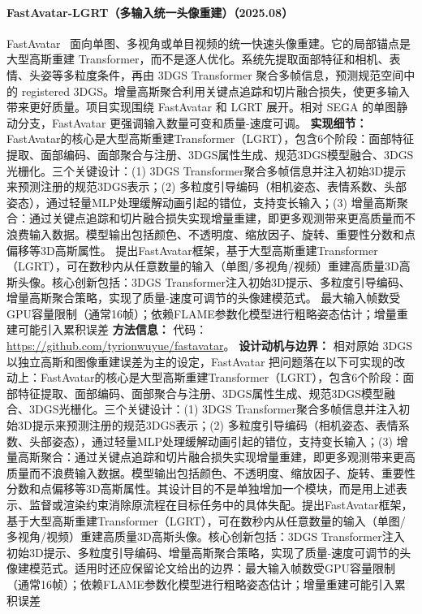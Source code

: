 \paragraph{FastAvatar-LGRT（多输入统一头像重建）（2025.08）}
FastAvatar~\cite{2508_19754} 面向单图、多视角或单目视频的统一快速头像重建。它的局部锚点是大型高斯重建 Transformer，而不是逐人优化。系统先提取面部特征和相机、表情、头姿等多粒度条件，再由 3DGS Transformer 聚合多帧信息，预测规范空间中的 registered 3DGS。增量高斯聚合利用关键点追踪和切片融合损失，使更多输入带来更好质量。项目实现围绕 FastAvatar 和 LGRT 展开。相对 SEGA 的单图静动分支，FastAvatar 更强调输入数量可变和质量-速度可调。
\textbf{实现细节：} FastAvatar的核心是大型高斯重建Transformer（LGRT），包含6个阶段：面部特征提取、面部编码、面部聚合与注册、3DGS属性生成、规范3DGS模型融合、3DGS光栅化。三个关键设计：(1) 3DGS Transformer聚合多帧信息并注入初始3D提示来预测注册的规范3DGS表示；(2) 多粒度引导编码（相机姿态、表情系数、头部姿态），通过轻量MLP处理缓解动画引起的错位，支持变长输入；(3) 增量高斯聚合：通过关键点追踪和切片融合损失实现增量重建，即更多观测带来更高质量而不浪费输入数据。模型输出包括颜色、不透明度、缩放因子、旋转、重要性分数和点偏移等3D高斯属性。 提出FastAvatar框架，基于大型高斯重建Transformer（LGRT），可在数秒内从任意数量的输入（单图/多视角/视频）重建高质量3D高斯头像。核心创新包括：3DGS Transformer注入初始3D提示、多粒度引导编码、增量高斯聚合策略，实现了质量-速度可调节的头像建模范式。 最大输入帧数受GPU容量限制（通常16帧）；依赖FLAME参数化模型进行粗略姿态估计；增量重建可能引入累积误差
\textbf{方法信息：} 代码：\url{https://github.com/tyrionwuyue/fastavatar}。
\textbf{设计动机与边界：} 相对原始 3DGS 以独立高斯和图像重建误差为主的设定，FastAvatar 把问题落在以下可实现的改动上：FastAvatar的核心是大型高斯重建Transformer（LGRT），包含6个阶段：面部特征提取、面部编码、面部聚合与注册、3DGS属性生成、规范3DGS模型融合、3DGS光栅化。三个关键设计：(1) 3DGS Transformer聚合多帧信息并注入初始3D提示来预测注册的规范3DGS表示；(2) 多粒度引导编码（相机姿态、表情系数、头部姿态），通过轻量MLP处理缓解动画引起的错位，支持变长输入；(3) 增量高斯聚合：通过关键点追踪和切片融合损失实现增量重建，即更多观测带来更高质量而不浪费输入数据。模型输出包括颜色、不透明度、缩放因子、旋转、重要性分数和点偏移等3D高斯属性。其设计目的不是单独增加一个模块，而是用上述表示、监督或渲染约束消除原流程在目标任务中的具体失配。提出FastAvatar框架，基于大型高斯重建Transformer（LGRT），可在数秒内从任意数量的输入（单图/多视角/视频）重建高质量3D高斯头像。核心创新包括：3DGS Transformer注入初始3D提示、多粒度引导编码、增量高斯聚合策略，实现了质量-速度可调节的头像建模范式。适用时还应保留论文给出的边界：最大输入帧数受GPU容量限制（通常16帧）；依赖FLAME参数化模型进行粗略姿态估计；增量重建可能引入累积误差
